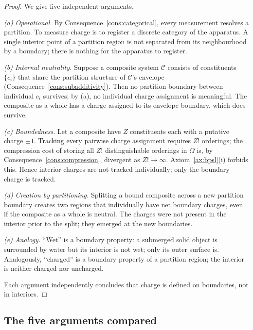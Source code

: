 \documentclass[11pt,twocolumn,a4paper]{article}
\theoremstyle{axiomstyle}
\theoremstyle{conseqstyle}
\theoremstyle{definition}
\theoremstyle{remark}
\begin{document}
\begin{proof}
We give five independent arguments.

\emph{(a) Operational.} By Consequence~\ref{cons:categorical}, every measurement resolves a partition. To measure charge is to register a discrete category of the apparatus. A single interior point of a partition region is not separated from its neighbourhood by a boundary; there is nothing for the apparatus to register.

\emph{(b) Internal neutrality.} Suppose a composite system $\mathcal{C}$ consists of constituents $\{c_{i}\}$ that share the partition structure of $\mathcal{C}$'s envelope (Consequence~\ref{cons:subadditivity}). Then no partition boundary between individual $c_{i}$ survives; by (a), no individual charge assignment is meaningful. The composite as a whole has a charge assigned to its envelope boundary, which does survive.

\emph{(c) Boundedness.} Let a composite have $Z$ constituents each with a putative charge $\pm 1$. Tracking every pairwise charge assignment requires $Z!$ orderings; the compression cost of storing all $Z!$ distinguishable orderings in $\Omega$ is, by Consequence~\ref{cons:compression}, divergent as $Z!\to\infty$. Axiom~\ref{ax:bpsl}(i) forbids this. Hence interior charges are not tracked individually; only the boundary charge is tracked.

\emph{(d) Creation by partitioning.} Splitting a bound composite across a new partition boundary creates two regions that individually have net boundary charges, even if the composite as a whole is neutral. The charges were not present in the interior prior to the split; they emerged at the new boundaries.

\emph{(e) Analogy.} ``Wet'' is a boundary property: a submerged solid object is surrounded by water but its interior is not wet; only its outer surface is. Analogously, ``charged'' is a boundary property of a partition region; the interior is neither charged nor uncharged.

Each argument independently concludes that charge is defined on boundaries, not in interiors.
\end{proof}

\subsection{The five arguments compared}
\end{document}
